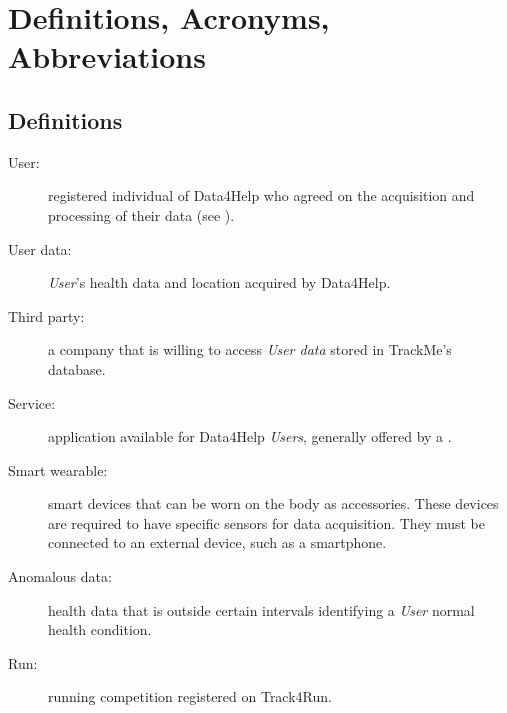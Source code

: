 \documentclass[../../DD.tex]{subfiles}
\begin{document}
\section{Definitions, Acronyms, Abbreviations}
		\subsection{Definitions}
		\begin{description}
			\item[User:]registered individual of Data4Help who agreed on the acquisition and processing of their data (see ).
			\item[User data:]\textit{User}'s health data and location acquired by Data4Help.
			\item[Third party:]a company that is willing to access \textit{User data} stored in TrackMe's database.
			\item[Service:]application available for Data4Help \textit{Users}, generally offered by a .
			\item[Smart wearable:]smart devices that can be worn on the body as accessories. These devices are required to have specific sensors for data acquisition. They must be connected to an external device, such as a smartphone.
			\item[Anomalous data:]health data that is outside certain intervals identifying a \textit{User} normal health condition.
			\item[Run:]running competition registered on Track4Run. 
			
			


		\end{description}
\end{document}
